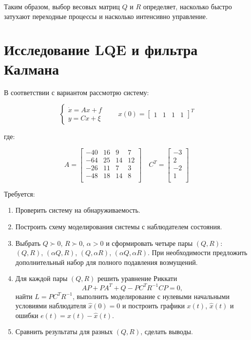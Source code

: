 \documentclass[a4paper,12pt]{article}
\begin{document}
	Таким образом, выбор весовых матриц $Q$ и $R$ определяет, насколько быстро затухают переходные процессы и насколько интенсивно управление.
	
	
	
	
	\newpage \section{Исследование LQE и фильтра Калмана}\label{sec:2}

В соответствии с вариантом рассмотрю систему:

\begin{equation}
	\begin{cases}
		\dot{x} = Ax + f \\
		y = Cx + \xi
	\end{cases}
	\qquad
	x(0) = \begin{bmatrix} 1 & 1 & 1 & 1 \end{bmatrix}^T
	\label{sys2}
\end{equation}

где:

\[
A = \begin{bmatrix} 
	-40 & 16 & 9 & 7 \\ 
	-64 & 25 & 14 & 12 \\ 
	-26 & 11 & 7 & 3 \\ 
	-48 & 18 & 14 & 8 \\ 

\end{bmatrix} \quad
C^T = \begin{bmatrix} -3 \\ 2 \\ -2 \\ 1 \\  \end{bmatrix} 
\]


Требуется:
\begin{enumerate}
	\item Проверить систему на обнаруживаемость.
	
	\item Построить схему моделирования системы с наблюдателем состояния.
	
	\item Выбрать $Q \succ 0$, $R \succ 0$, $\alpha > 0$ и сформировать четыре пары $(Q,R)$: $(Q,R)$, $(\alpha Q,R)$, $(Q,\alpha R)$, $(\alpha Q,\alpha R)$. При необходимости предложить дополнительный набор для полного подавления возмущений.
	
	\item Для каждой пары $(Q,R)$ решить уравнение Риккати
	\[
	AP + PA^T + Q - PC^T R^{-1} C P = 0,
	\]
	найти $L = PC^T R^{-1}$, выполнить моделирование с нулевыми начальными условиями наблюдателя $\hat{x}(0) = 0$ и построить графики $x(t)$, $\hat{x}(t)$ и ошибки $e(t) = x(t) - \hat{x}(t)$.
	
	\item Сравнить результаты для разных $(Q,R)$, сделать выводы.
\end{enumerate}
\end{document}
